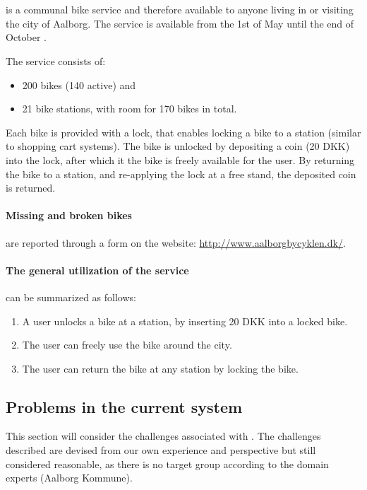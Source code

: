 \section{\citybike}\label{aalborg_bycyklen}
\citybike is a communal bike service and therefore available to anyone living in or visiting the city of Aalborg.
The service is available from the 1st of May until the end of October \cite{aalborgbycyklenbagcyklen}.

\noindent The service consists of:
\begin{itemize}
\item 200 bikes (140 active) and 
\item 21 bike stations, with room for 170 bikes in total.
\end{itemize}
Each bike is provided with a lock, that enables locking a bike to a station (similar to shopping cart systems).
The bike is unlocked by depositing a coin (20 DKK) into the lock, after which it the bike is freely available for the user.
By returning the bike to a station, and re-applying the lock at a free stand, the deposited coin is returned.

\paragraph{Missing and broken bikes} are reported through a form on the \citybike website: \url{http://www.aalborgbycyklen.dk/}.

\paragraph{The general utilization of the service} can be summarized as follows:
\begin{enumerate}
\item A user unlocks a bike at a station, by inserting 20 DKK into a locked bike.
\item The user can freely use the bike around the city.
\item The user can return the bike at any station by locking the bike.
\end{enumerate}

\subsection{Problems in the current system} \label{aalborg_bycyklen:challenges}
This section will consider the challenges associated with \citybike.
The challenges described are devised from our own experience and perspective but still considered reasonable, as there is no target group according to the domain experts (Aalborg Kommune).

